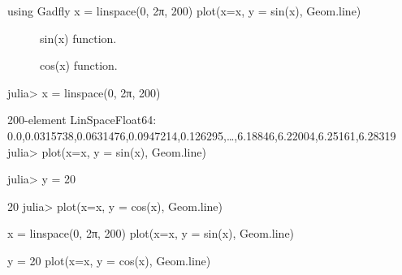 

\begin{juliacode}
using Gadfly
x = linspace(0, 2π, 200)
plot(x=x, y = sin(x), Geom.line)
\end{juliacode}
\begin{figure}[ht]
\center
\resizebox{\linewidth}{!}{}
\caption{sin(x) function.}
\label{fig:sin_fun}
\end{figure}



\begin{figure}[htpb]
\center
\resizebox{\linewidth}{!}{}
\caption{cos(x) function.}
\end{figure}



\resizebox{\linewidth}{!}{}



\begin{juliaterm}
julia> x = linspace(0, 2π, 200)

200-element LinSpace{Float64}:
 0.0,0.0315738,0.0631476,0.0947214,0.126295,…,6.18846,6.22004,6.25161,6.28319
julia> plot(x=x, y = sin(x), Geom.line)

\end{juliaterm}
\resizebox{\linewidth}{!}{}

\begin{juliaterm}
julia> y = 20

20
julia> plot(x=x, y = cos(x), Geom.line)
\end{juliaterm}
\resizebox{\linewidth}{!}{}



\begin{juliacode}
x = linspace(0, 2π, 200)
plot(x=x, y = sin(x), Geom.line)

\end{juliacode}
\resizebox{15cm}{!}{}

\begin{juliacode}
y = 20
plot(x=x, y = cos(x), Geom.line)
\end{juliacode}
\resizebox{15cm}{!}{}
